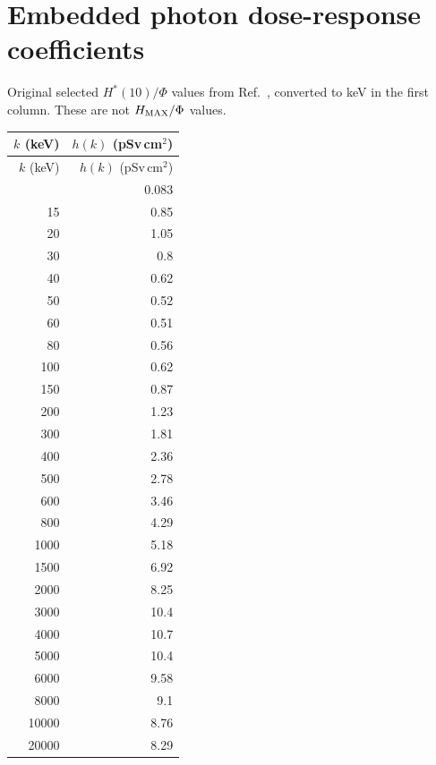 \documentclass[10pt,a4paper]{article}
\begin{document}
\clearpage
\section{Embedded photon dose-response coefficients}
Original selected $H^*(10)/\Phi$ values from Ref.~\cite{ferrari}, converted to keV in the first column. These are not $H_{\rm MAX}/\Phi$ values.
\small
\begin{longtable}{rr}
\toprule
$k$ (keV) & $h(k)$ (pSv\,cm$^2$) \\
\midrule
\endfirsthead
\toprule
$k$ (keV) & $h(k)$ (pSv\,cm$^2$) \\
\midrule
\endhead
\bottomrule
\endfoot
10 & 0.083 \\
15 & 0.85 \\
20 & 1.05 \\
30 & 0.8 \\
40 & 0.62 \\
50 & 0.52 \\
60 & 0.51 \\
80 & 0.56 \\
100 & 0.62 \\
150 & 0.87 \\
200 & 1.23 \\
300 & 1.81 \\
400 & 2.36 \\
500 & 2.78 \\
600 & 3.46 \\
800 & 4.29 \\
1000 & 5.18 \\
1500 & 6.92 \\
2000 & 8.25 \\
3000 & 10.4 \\
4000 & 10.7 \\
5000 & 10.4 \\
6000 & 9.58 \\
8000 & 9.1 \\
10000 & 8.76 \\
20000 & 8.29 \\
\end{longtable}
\normalsize
\end{document}
